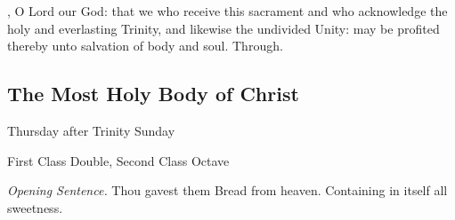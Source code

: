 \vspace{-0.5\baselineskip}

\postcommunion
{}, O Lord our God: that we who receive this sacrament and who acknowledge the holy and everlasting Trinity, and likewise the undivided Unity: may be profited thereby unto salvation of body and soul. Through.

%

\subsection{The Most Holy Body of Christ}
\begin{inhead}
	{Thursday after Trinity Sunday}\par
    {First Class Double, Second Class Octave}
\end{inhead}
\par\noindent
\textit{Opening Sentence.} Thou gavest them Bread from heaven. Containing in itself all sweetness.

\vspace{-0.25\baselineskip}


